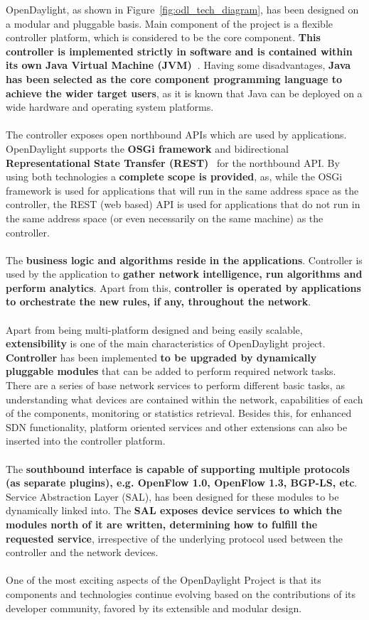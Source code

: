 \documentclass[a4paper, 12pt]{book}
\begin{document}
OpenDaylight, as shown in Figure~\ref{fig:odl_tech_diagram}, has been designed on a modular and pluggable basis. Main component of the project is a flexible controller platform, which is considered to be the core component. \textbf{This controller is implemented strictly in software and is contained within its own Java Virtual Machine (JVM)~\cite{Java}}. Having some disadvantages, \textbf{Java has been selected as the core component programming language to achieve the wider target users}, as it is known that Java can be deployed on a wide hardware and operating system platforms.\\
\\
The controller exposes open northbound APIs which are used by applications. OpenDaylight supports the \textbf{OSGi framework} and bidirectional \textbf{Representational State Transfer (REST)}~\cite{REST} for the northbound API. By using both technologies a \textbf{complete scope is provided}, as, while the OSGi framework is used for applications that will run in the same address space as the controller, the REST (web based) API is used for applications that do not run in the same address space (or even necessarily on the same machine) as the controller.\\
\\
The \textbf{business logic and algorithms reside in the applications}. Controller is used by the application to \textbf{gather network intelligence, run algorithms and perform analytics}. Apart from this, \textbf{controller is operated by applications to orchestrate the new rules, if any, throughout the network}.\\
\\
Apart from being multi-platform designed and being easily scalable, \textbf{extensibility} is one of the main characteristics of OpenDaylight project. \textbf{Controller} has been implemented \textbf{to be upgraded by dynamically pluggable modules} that can be added to perform required network tasks. There are a series of base network services to perform different basic tasks, as understanding what devices are contained within the network, capabilities of each of the components, monitoring or statistics retrieval. Besides this, for enhanced SDN functionality, platform oriented services and other extensions can also be inserted into the controller platform.\\
\\
The \textbf{southbound interface is capable of supporting multiple protocols (as separate plugins), e.g. OpenFlow 1.0, OpenFlow 1.3, BGP-LS, etc}. Service Abstraction Layer (SAL), has been designed for these modules to be dynamically linked into. The \textbf{SAL exposes device services to which the modules north of it are written, determining how to fulfill the requested service}, irrespective of the underlying protocol used between the controller and the network devices.\\
\\
One of the most exciting aspects of the OpenDaylight Project is that its components and technologies continue evolving based on the contributions of its developer community, favored by its extensible and modular design.
\end{document}
